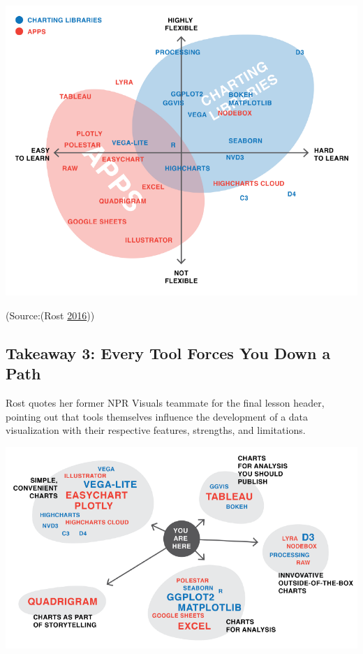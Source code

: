\documentclass[]{book}
\begin{document}
\includegraphics{images/apps_vs_code.png}

(Source:(Rost \protect\hyperlink{ref-different_tools}{2016}))

\hypertarget{takeaway-3-every-tool-forces-you-down-a-path}{%
\subsection{Takeaway 3: Every Tool Forces You Down a Path}\label{takeaway-3-every-tool-forces-you-down-a-path}}

Rost quotes her former NPR Visuals teammate for the final lesson header, pointing out that tools themselves influence the development of a data visualization with their respective features, strengths, and limitations.

\includegraphics{images/tools_force_paths.png}
\end{document}
